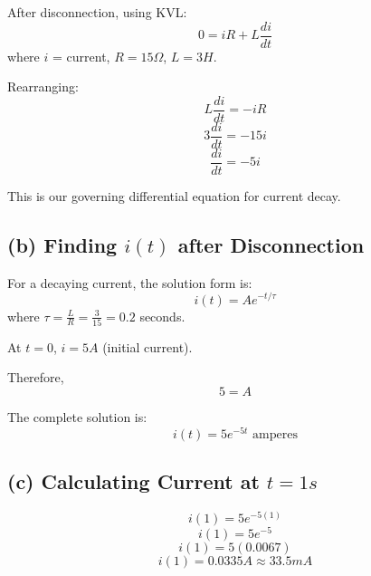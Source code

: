 \documentclass[12pt]{article}
\begin{document}
		After disconnection, using KVL:
		\begin{equation}
			0 = iR + L\frac{di}{dt}
		\end{equation}
		where \( i \) = current, \( R = 15\Omega \), \( L = 3H \).
		
		Rearranging:
		\begin{equation}
			L\frac{di}{dt} = -iR
		\end{equation}
		\begin{equation}
			3\frac{di}{dt} = -15i
		\end{equation}
		\begin{equation}
			\frac{di}{dt} = -5i
		\end{equation}
		
		This is our governing differential equation for current decay.
		
		\subsection*{(b) Finding \( i(t) \) after Disconnection}
		
		For a decaying current, the solution form is:
		\begin{equation}
			i(t) = A e^{-t/\tau}
		\end{equation}
		where \( \tau = \frac{L}{R} = \frac{3}{15} = 0.2 \) seconds.
		
		At \( t = 0 \), \( i = 5A \) (initial current).
		
		Therefore,
		\begin{equation}
			5 = A
		\end{equation}
		
		The complete solution is:
		\begin{equation}
			i(t) = 5e^{-5t} \text{ amperes}
		\end{equation}
		
		\subsection*{(c) Calculating Current at \( t = 1s \)}
		
		\begin{equation}
			i(1) = 5e^{-5(1)}
		\end{equation}
		\begin{equation}
			i(1) = 5e^{-5}
		\end{equation}
		\begin{equation}
			i(1) = 5(0.0067)
		\end{equation}
		\begin{equation}
			i(1) = 0.0335A \approx 33.5mA
		\end{equation}
		
\end{document}
